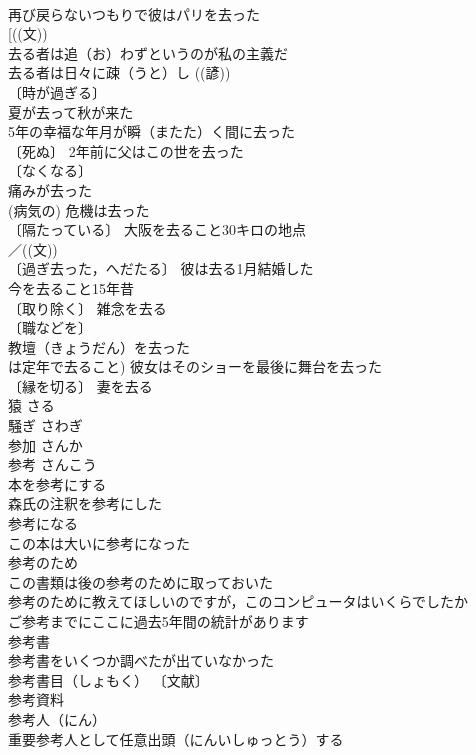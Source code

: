 \documentclass[8pt]{extreport}
\begin{document}
\begin{CJK}{UTF8}{min}
\\	再び戻らないつもりで彼はパリを去った 
\\	[((文))
\\	去る者は追（お）わずというのが私の主義だ 
\\	去る者は日々に疎（うと）し ((諺)) 
\\	〔時が過ぎる〕
\\	夏が去って秋が来た 
\\	5年の幸福な年月が瞬（またた）く間に去った 
\\	〔死ぬ〕 2年前に父はこの世を去った 
\\	〔なくなる〕
\\	痛みが去った 
\\	(病気の) 危機は去った 
\\	〔隔たっている〕 大阪を去ること30キロの地点 
\\	／((文))
\\	〔過ぎ去った，へだたる〕 彼は去る1月結婚した 
\\	今を去ること15年昔 
\\	〔取り除く〕 雑念を去る 
\\	〔職などを〕
\\	教壇（きょうだん）を去った 
\\	は定年で去ること) 彼女はそのショーを最後に舞台を去った 
\\	〔縁を切る〕 妻を去る 
\\	猿	さる	
\\	騒ぎ	さわぎ	
\\	参加	さんか	
\\	参考	さんこう	
\\	本を参考にする 
\\	森氏の注釈を参考にした 
\\	参考になる 
\\	この本は大いに参考になった 
\\	参考のため 
\\	この書類は後の参考のために取っておいた 
\\	参考のために教えてほしいのですが，このコンピュータはいくらでしたか 
\\	ご参考までにここに過去5年間の統計があります 
\\	参考書 
\\	参考書をいくつか調べたが出ていなかった 
\\	参考書目（しょもく） 〔文献〕
\\	参考資料 
\\	参考人（にん） 
\\	重要参考人として任意出頭（にんいしゅっとう）する 

\end{CJK}
\end{document}
